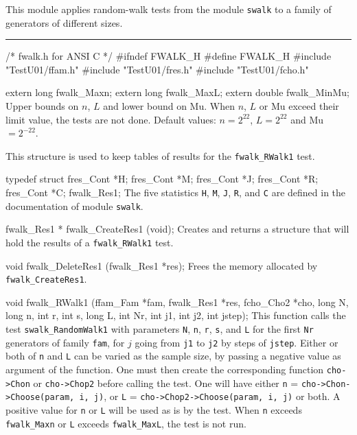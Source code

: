 
This module applies random-walk tests from the module {\tt swalk}
to a family of generators of different sizes.

\bigskip
\hrule
\code\hide
/* fwalk.h  for ANSI C */
#ifndef FWALK_H
#define FWALK_H
\endhide
#include "TestU01/ffam.h"
#include "TestU01/fres.h"
#include "TestU01/fcho.h"


extern long fwalk_Maxn;
extern long fwalk_MaxL;
extern double fwalk_MinMu;
\endcode
\tab
  Upper bounds on $n$, $L$ and lower bound on Mu.
  When $n$, $L$ or Mu exceed their limit value, the tests are not done.
  Default values: $n = 2^{22}$, $L = 2^{22}$ and Mu ${} = 2^{-22}$.
\endtab


\ifdetailed  %


This structure is used to keep tables of results for the
 {\tt fwalk\_RWalk1} test.
\code

typedef struct {
   fres_Cont *H;
   fres_Cont *M;
   fres_Cont *J;
   fres_Cont *R;
   fres_Cont *C;
} fwalk_Res1;
\endcode
 \tab The five statistics {\tt H}, {\tt M}, {\tt J}, {\tt R}, and {\tt C}
  are defined in the documentation of module {\tt swalk}.
 \endtab
\code


fwalk_Res1 * fwalk_CreateRes1 (void);
\endcode
 \tab
  Creates and returns a structure that will hold the results
  of a {\tt fwalk\_RWalk1} test.
 \endtab
\code


void fwalk_DeleteRes1 (fwalk_Res1 *res);
\endcode
 \tab
  Frees the memory allocated by {\tt fwalk\_CreateRes1}.
 \endtab

\fi %


\code

void fwalk_RWalk1 (ffam_Fam *fam, fwalk_Res1 *res, fcho_Cho2 *cho,
                   long N, long n, int r, int s, long L,
                   int Nr, int j1, int j2, int jstep);
\endcode
\tab This function calls the test {\tt swalk\_RandomWalk1} with
  parameters {\tt N}, {\tt n},  {\tt r},  {\tt s}, and {\tt L} for the
  first {\tt Nr} generators of family {\tt fam}, for $j$ going from
  {\tt j1} to {\tt j2} by steps of {\tt jstep}. Either or both of  {\tt n}
  and {\tt L} can be varied as the sample size, by passing a negative value as
  argument of the function. One must then create the corresponding function
  {\tt cho->Chon} or {\tt cho->Chop2} before calling the test.
  One will have either {\tt n} = {\tt cho->Chon->Choose(param, i, j)},
  or {\tt L} = {\tt cho->Chop2->Choose(param, i, j)} or both. A positive
  value for {\tt n} or {\tt L} will be used as is by the test. When {\tt n}
  exceeds {\tt fwalk\_Maxn} or {\tt L} exceeds {\tt fwalk\_MaxL},
  the test is not run.
\endtab
\code


